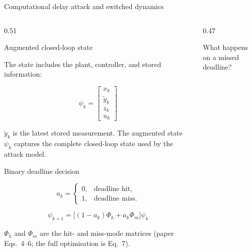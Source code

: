 \documentclass[8pt,aspectratio=169]{beamer}
\gdef\CPSOrigin{PAPER}%
\gdef\CPSSourceContext{}%
\begin{document}
\begin{frame}{Computational delay attack and switched dynamics}
\gdef\CPSSourceContext{}
\gdef\CPSOrigin{PAPER}

\footnotesize

\begin{columns}[T,onlytextwidth]

\begin{column}{0.51\textwidth}

\begin{block}{Augmented closed-loop state}

The state includes the plant, controller, and stored information:

\[
\boxed{
\psi_k=
\begin{bmatrix}
x_k\\
\tilde y_k\\
z_k\\
u_k
\end{bmatrix}
}
\]

\vspace{-1mm}

\scriptsize
$\tilde y_k$ is the latest stored measurement.
The augmented state $\psi_k$ captures the complete
closed-loop state used by the attack model.

\end{block}

\begin{block}{Binary deadline decision}

\[
a_k=
\begin{cases}
0,&\text{deadline hit},\\
1,&\text{deadline miss}.
\end{cases}
\]

\[
\boxed{
\psi_{k+1}
=
\big[(1-a_k)\Phi_h+a_k\Phi_m\big]\psi_k
}
\]

\scriptsize
$\Phi_h$ and $\Phi_m$ are the hit- and miss-mode matrices
(paper Eqs.~4--6; the full optimisation is Eq.~7).

\end{block}

\end{column}


\begin{column}{0.47\textwidth}

\begin{block}{What happens on a missed deadline?}


\end{block}
\end{column}
\end{columns}
\end{frame}
\end{document}
